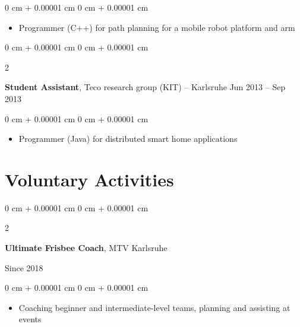 \documentclass[10pt, letterpaper]{article}
\newenvironment{highlights}{
    \begin{itemize}[
        topsep=0.10 cm,
        parsep=0.10 cm,
        partopsep=0pt,
        itemsep=0pt,
        leftmargin=0 cm + 10pt
    ]
}{
    \end{itemize}
} %
\newenvironment{onecolentry}{
    \begin{adjustwidth}{
        0 cm + 0.00001 cm
    }{
        0 cm + 0.00001 cm
    }
}{
    \end{adjustwidth}
} %
\newenvironment{twocolentry}[2][]{
    \onecolentry
    \def\secondColumn{#2}
    \setcolumnwidth{\fill, 4.5 cm}
    \begin{paracol}{2}
}{
    \switchcolumn \raggedleft \secondColumn
    \end{paracol}
    \endonecolentry
} %
\begin{document}
        \vspace{0.10 cm}
        \begin{onecolentry}
            \begin{highlights}
                \item Programmer (C++) for path planning for a mobile robot platform and arm
            \end{highlights}
        \end{onecolentry}
        
        \expspace
        \begin{twocolentry}{
            Jun 2013 – Sep 2013
        }
            \textbf{Student Assistant}, Teco research group (KIT) -- Karlsruhe\end{twocolentry}

        \vspace{0.10 cm}
        \begin{onecolentry}
            \begin{highlights}
                \item Programmer (Java) for distributed smart home applications
            \end{highlights}
        \end{onecolentry}

        


    \sectionspace
    \section{Voluntary Activities}
    \sectspacetop
    \begin{twocolentry}{
            Since 2018
        }
            \textbf{Ultimate Frisbee Coach}, MTV Karlsruhe
           \end{twocolentry}
        \begin{onecolentry}
            \begin{highlights}
                \item Coaching beginner and intermediate-level teams, planning and assisting at events
            \end{highlights}
        \end{onecolentry}
\end{document}
